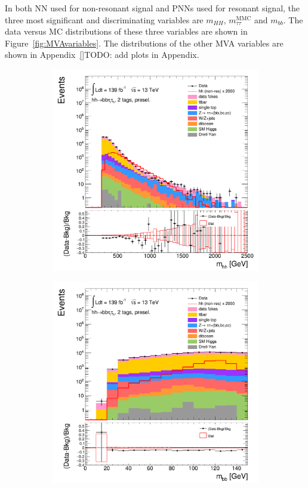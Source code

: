 In both NN used for non-resonant signal and PNNs used for resonant signal,
the three most significant and discriminating variables are
$m_{HH}$, $m_{\tau\tau}^\text{MMC}$ and $m_{bb}$. 
The data versus MC distributions of these three variables are shown in 
Figure~\ref{fig:MVAvariables}. 
The distributions of the other MVA variables are shown in Appendix~\ref{}TODO: add plots in Appendix. 


\begin{figure}[htbp]
\begin{subfigure}{.32\textwidth}
\centering
\includegraphics[width=0.85\linewidth]{DiHiggs/plots/MVA/SLT_Final/HNone/BDTVarsPreselection/2/C_2tag2pjet_0ptv_Mhh_Log.png}
\caption{}
\label{fig:MVAvariables:a}
\end{subfigure}
\begin{subfigure}{.32\textwidth}
\centering
\includegraphics[width=0.85\linewidth]{DiHiggs/plots/MVA/SLT_Final/HNone/BDTVarsPreselection/2/C_2tag2pjet_0ptv_mbb_Log.png}

\end{subfigure}
\end{figure}
